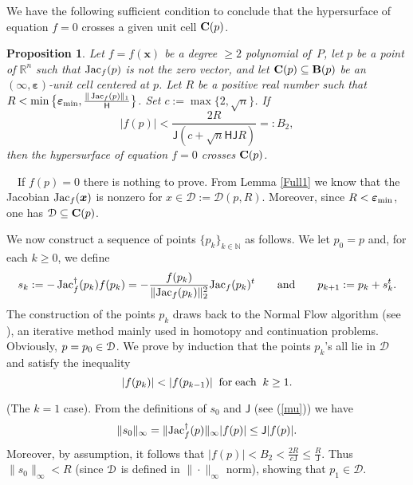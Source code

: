 \documentclass[10pt]{article}
\newcommand\sD{{\cal D}}
\newcommand{\x}{{\bm x}}
\newcommand\proof{\noindent{\em Proof.}\ \ } \newcommand\mult{\mbox{\rm mult}}
\newcommand\N{{\mathbb N}}
\newcommand\R{{\mathbb R}}
\newcommand{\epsbold}{{\bm \varepsilon}}
\def\Jac{\mathop{\rm Jac}\nolimits}
\newtheorem{prop}[theorem]{Proposition}
\begin{document}
We have the following sufficient condition to conclude that  the hypersurface of equation $f=0$  
crosses  a given unit cell ${\bf C}(p)$. 

\begin{prop}\label{PropPassa} 
Let $f=f(\x)$ be a degree $\geq 2$ polynomial of~$P$,
let $p$ be a point of $\R^n$ such that $\Jac_f(p)$ is not the zero vector, 
and let ${\bf C}(p) \subseteq {\bf B}(p)$
be an $(\infty,\epsbold)$-unit cell  centered at $p$.
Let $R$ be a positive real number such that 
$R < \min \big\{\epsbold_{\rm min}, \frac{\|\Jac_f(p)\|_1}{{\mathsf H}}\big\}$.
Set $c:=\max\{2, \sqrt{n}\}$. If 
$$
|f(p)| < \frac{2R}{\mathsf J(c+  \sqrt{n}{\mathsf H} {\mathsf J} R)}  =: B_2,
$$
then the hypersurface of equation $f=0$ crosses ${\bf C}(p)$.
\end{prop}
\proof  If $f(p)=0$ there is nothing to prove.
From Lemma \ref{Full1} we know that the Jacobian   $\Jac_f(\bm x)$ is nonzero for   $x\in \mathcal D:=\mathcal D(p, R)$.
Moreover, since $R< \epsbold_{\rm min}$, one has $\sD\subseteq \mathcal {\bf C}(p)$.

We now construct a sequence of points $\{p_k\}_{k \in \N}$ as follows. 
We let $p_0=p$ and, for each $k \ge 0$, we define 
\begin{equation}\label{DEF1}
s_k:=-\Jac_f^\dagger(p_k)  f(p_k)= - \frac{f(p_k)}{\|{\rm Jac}_f(p_k)\|_2^2} {\rm Jac}_f(p_k)^t \qquad {\rm and}\qquad
p_{k+1}:=p_k+s_k^t.
\end{equation}
The construction of the points $p_k$ draws back to the Normal Flow algorithm
(see \cite{WW}), an iterative method mainly used in homotopy  and continuation 
problems. 
Obviously, $p=p_0\in \sD$.
We prove by induction that the points  $p_k$'s all lie in $ \mathcal D$ and satisfy the
 inequality 
 \begin{equation}\label{civuole}
 |f(p_k)| <  |f(p_{k-1})| \;\;{\rm for \; each}\;\;k\geq 1.\end{equation}


 (The $k=1$ case). 
From the definitions of $s_0$ and $\mathsf J$ (see (\ref{mu})) we have
$$
\|s_0\|_\infty = \|{\rm Jac}_f^\dagger(p)\|_\infty |f(p)| \le {\mathsf J} |f(p)|.
$$
Moreover, by assumption, it follows that
$|f(p)| <B_2 < \frac{2 R}{c \mathsf J} \le \frac{R}{\mathsf J}$.  Thus $\|s_0\|_\infty < R$ (since $\sD$ is defined in $\| \cdot  \|_\infty$ norm), showing that  $p_1 \in \mathcal D$.
\end{document}
